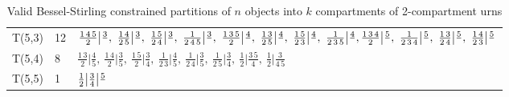 \documentclass[a4paper]{amsart}
\begin{document}
\begin{table}[]
\begin{tabular}{|l|l|p{10.5cm}|}
        T(5,3) & 12 & \texttt{$
            \frac{1\,4\,5}{2}\big|\frac{3}{},\
            \frac{1\,4}{2\,5}\big|\frac{3}{\,},\
            \frac{1\,5}{2\,4}\big|\frac{3}{\,},\
            \frac{1}{2\,4\,5}\big|\frac{3}{\,},\
            \frac{1\,3\,5}{2}\big|\frac{4}{\,},\
            \frac{1\,3}{2\,5}\big|\frac{4}{\,},\
            \frac{1\,5}{2\,3}\big|\frac{4}{\,},\
            \frac{1}{2\,3\,5}\big|\frac{4}{\,},\
            \newline\newline
            \smallskip
            \frac{1\,3\,4}{2}\big|\frac{5}{\,},\
            \frac{1}{2\,3\,4}\big|\frac{5}{\,},\
            \frac{1\,3}{2\,4}\big|\frac{5}{\,},\
            \frac{1\,4}{2\,3}\big|\frac{5}{\,}
        $}\\
            
        T(5,4) & 8 & \texttt{$
            \frac{1\,3}{2} \big| \frac{4}{5},\
            \frac{1\,4}{2} \big| \frac{3}{5},\
            \frac{1\,5}{2} \big| \frac{3}{4},\
            \frac{1}{2\,3} \big| \frac{4}{5},\
            \frac{1}{2\,4} \big| \frac{3}{5},\
            \frac{1}{2\,5} \big| \frac{3}{4},\
            \frac{1}{2} \big| \frac{3\,5}{4},\
            \frac{1}{2} \big| \frac{3}{4\,5}
        $}\\
        T(5,5) & 1 & \texttt{$
            \frac{1}{2}\big|\frac{3}{4}\big|\frac{5}{\,}
            \smallskip
        $}\\
        \hline
        \end{tabular}
        \bigskip
    \caption{Valid Bessel-Stirling constrained partitions of $n$ objects into $k$ compartments of 2-compartment urns}
    \label{tab-bs-enumeration}
\end{table}
\egroup
\end{document}
